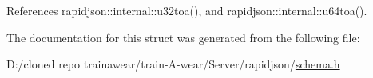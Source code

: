 References rapidjson\+::internal\+::u32toa(), and rapidjson\+::internal\+::u64toa().



The documentation for this struct was generated from the following file\+:\begin{DoxyCompactItemize}
\item 
D\+:/cloned repo trainawear/train-\/\+A-\/wear/\+Server/rapidjson/\mbox{\hyperlink{schema_8h}{schema.\+h}}\end{DoxyCompactItemize}
